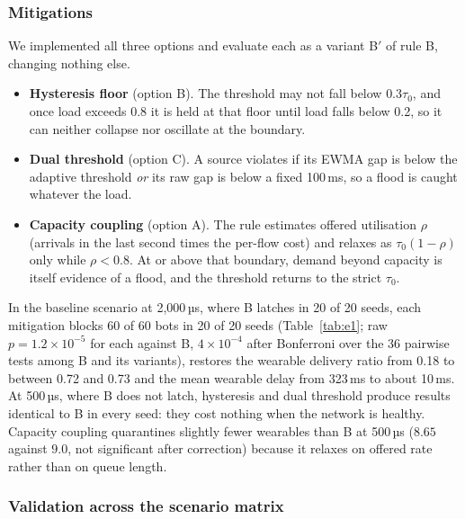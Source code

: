 \subsubsection{Mitigations}
We implemented all three options and evaluate each as a variant B$'$ of rule B, changing nothing else.
\begin{itemize}[leftmargin=1.2em,itemsep=1pt,topsep=2pt]
\item \textbf{Hysteresis floor} (option B). The threshold may not fall below $0.3\tau_0$, and once load exceeds 0.8 it is held at that floor until load falls below 0.2, so it can neither collapse nor oscillate at the boundary.
\item \textbf{Dual threshold} (option C). A source violates if its EWMA gap is below the adaptive threshold \emph{or} its raw gap is below a fixed 100\,ms, so a flood is caught whatever the load.
\item \textbf{Capacity coupling} (option A). The rule estimates offered utilisation $\rho$ (arrivals in the last second times the per-flow cost) and relaxes as $\tau_0(1-\rho)$ only while $\rho < 0.8$. At or above that boundary, demand beyond capacity is itself evidence of a flood, and the threshold returns to the strict $\tau_0$.
\end{itemize}
In the baseline scenario at 2,000\,µs, where B latches in 20 of 20 seeds, each mitigation blocks 60 of 60 bots in 20 of 20 seeds (Table~\ref{tab:e1}; raw $p = 1.2\times10^{-5}$ for each against B, $4\times10^{-4}$ after Bonferroni over the 36 pairwise tests among B and its variants), restores the wearable delivery ratio from 0.18 to between 0.72 and 0.73 and the mean wearable delay from 323\,ms to about 10\,ms. At 500\,µs, where B does not latch, hysteresis and dual threshold produce results identical to B in every seed: they cost nothing when the network is healthy. Capacity coupling quarantines slightly fewer wearables than B at 500\,µs ($8.65$ against $9.0$, not significant after correction) because it relaxes on offered rate rather than on queue length.

\subsubsection{Validation across the scenario matrix}
